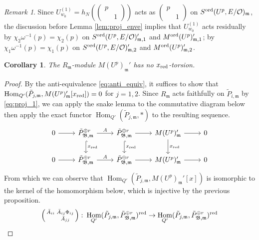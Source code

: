 \documentclass[leqno]{amsart}
\newtheorem{cor}[thm]{Corollary}
\theoremstyle{definition}
\theoremstyle{remark}
\newtheorem{rem}[thm]{Remark}
\newcommand{\smat}[1]{\left(\begin{smallmatrix} #1 \end{smallmatrix}\right)}
\newcommand{\oo}{\mathcal{O}}
\DeclareMathOperator{\Hom}{Hom}
\newcommand{\fm}{\mathfrak{m}}
\newcommand{\B}{\mathfrak B} %
\newcommand{\red}{\textnormal{red}}
\newcommand{\xx}{x_\textnormal{red}}
\newcommand{\ord}{\textnormal{ord}} %
\begin{document}
\begin{rem}
Since $U_{w_0}^{(1)}=h_N(\smat{p&\\&1})$
acts as $\smat{p&\\&1}$ on 
$S^{\ord}(U^p,E/\oo)_{\fm}$,
the discussion before Lemma \ref{lem:proj_enve}
implies that 
$U_{w_0}^{(1)}$ acts residually 
by $\chi_2\omega^{-1}(p)=\chi_2(p)$ on 
$S^{\ord}(U^p,E/\oo)_{\fm,1}'$ and 
$M^{\ord}(U^p)_{\fm, 1}'$;
by  $\chi_1\omega^{-1}(p)=\chi_1(p)$ on 
$S^{\ord}(U^p,E/\oo)_{\fm,2}'$ and 
$M^{\ord}(U^p)_{\fm, 2}'$.
\end{rem}

\begin{cor}\label{cor:no_torsion}
    The $R_\fm$-module $M(U^p)_{\fm}'$
    has no $\xx$-torsion.
\end{cor}
\begin{proof}
    By the anti-equivalence \eqref{eq:anti_equiv},
	it suffices to show that
	$\Hom_{Q'}(\tilde{P}_{j,\fm}, M(U^p)_{\fm}'[\xx])=0$
	for $j=1,2$.
    Since $R_\fm$ acts faithfully on $\tilde{P}_{i,\fm}$
    by \eqref{eq:proj_1}, 
	we can apply the snake lemma to the commutative diagram
    below then apply the exact functor
    $\Hom_{Q'}(\tilde{P}_{j,\fm}, *)$
    to the resulting sequence.
    \begin{equation*}
    \begin{tikzcd}
    0 \arrow[r] & 
    \tilde{P}_{\B,\fm}^{\oplus r} 
	\arrow[d,"\xx",hookrightarrow] \arrow[r,"A"] & 
	\tilde{P}_{\B,\fm}^{\oplus r} 
	\arrow[d,"\xx",hookrightarrow] \arrow[r] & 
	M(U^p)_{\fm}'
    \arrow[d,"\xx"]  \arrow[r] & 0 \\ 
    0 \arrow[r] & 
    \tilde{P}_{\B,\fm}^{\oplus r}
	\arrow[r,"A"] & 
    \tilde{P}_{\B,\fm}^{\oplus r}
	\arrow[r] &
    M(U^p)_{\fm}'  
    \arrow[r] & 0 
    \end{tikzcd}
\end{equation*}
From which we can observe that
$\Hom_{Q'}(\tilde{P}_{j,\fm}, M(U^p)_{\fm}'[x])$
is isomorphic to the kernel of the homomorphism below,
which is injective by the previous proposition.
\begin{equation}\label{eq:fil_ij}
	\smat{\bar{A}_{ii}& \bar{A}_{ij}\Phi_{ij}\\& \bar{A}_{jj}}\colon 
	\Hom_{Q'}(\tilde{P}_{j,\fm},\tilde{P}_{\B,\fm}^{\oplus r})^{\red}\to
	\Hom_{Q'}(\tilde{P}_{j,\fm},\tilde{P}_{\B,\fm}^{\oplus r})^{\red}
\end{equation}
\end{proof}
\end{document}
